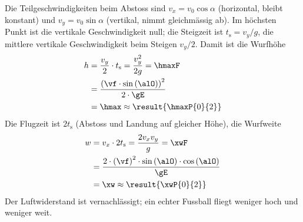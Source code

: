 \begin{center}
\end{center}

Die Teilgeschwindigkeiten beim Abstoss sind $v_x = v_0\cos\alpha$ (horizontal, bleibt konstant) und $v_y = v_0\sin\alpha$ (vertikal, nimmt gleichmässig ab). Im höchsten Punkt ist die vertikale Geschwindigkeit null; die Steigzeit ist $t_\text{s} = v_y/g$, die mittlere vertikale Geschwindigkeit beim Steigen $v_y/2$. Damit ist die Wurfhöhe
\begin{align}
 h &= \frac{v_y}{2}\cdot t_\text{s} = \frac{v_y^2}{2g} = \hmaxF \\
   &= \frac{\left(\vf\cdot\sin\left(\alO\right)\right)^2}{2\cdot\gE} \\
   &= \hmax \approx \result{\hmaxP{0}{2}}
\end{align}
Die Flugzeit ist $2t_\text{s}$ (Abstoss und Landung auf gleicher Höhe), die Wurfweite
\begin{align}
 w &= v_x\cdot 2t_\text{s} = \frac{2v_xv_y}{g} = \xwF \\
   &= \frac{2\cdot\left(\vf\right)^2\cdot\sin\left(\alO\right)\cdot\cos\left(\alO\right)}{\gE} \\
   &= \xw \approx \result{\xwP{0}{2}}
\end{align}
Der Luftwiderstand ist vernachlässigt; ein echter Fussball fliegt weniger hoch und weniger weit.
